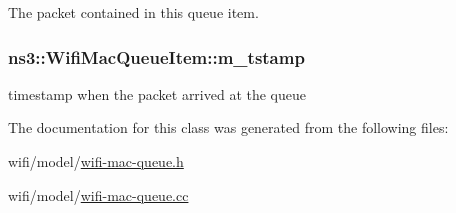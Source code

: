 The packet contained in this queue item. 

\subsubsection[{\texorpdfstring{m\+\_\+tstamp}{m_tstamp}}]{ ns3\+::\+Wifi\+Mac\+Queue\+Item\+::m\+\_\+tstamp\hspace{0.3cm}{\ttfamily [private]}}\hypertarget{classns3_1_1WifiMacQueueItem_abb20b7c4be728aee350cc5f2583cae97}{}\label{classns3_1_1WifiMacQueueItem_abb20b7c4be728aee350cc5f2583cae97}


timestamp when the packet arrived at the queue 



The documentation for this class was generated from the following files\+:\begin{DoxyCompactItemize}
\item 
wifi/model/\hyperlink{wifi-mac-queue_8h}{wifi-\/mac-\/queue.\+h}\item 
wifi/model/\hyperlink{wifi-mac-queue_8cc}{wifi-\/mac-\/queue.\+cc}\end{DoxyCompactItemize}
